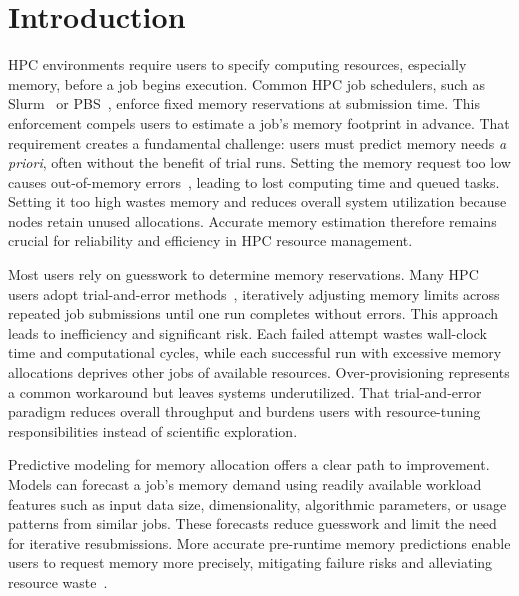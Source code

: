 \section{Introduction}
\label{sec:pmc-introduction}

\ac{HPC} environments require users to specify computing resources, especially memory, before a job begins execution.
Common \ac{HPC} job schedulers, such as Slurm~\cite{yoo2003slurm} or \ac{PBS}~\cite{henderson1995pbs}, enforce fixed memory reservations at submission time.
This enforcement compels users to estimate a job's memory footprint in advance.
That requirement creates a fundamental challenge: users must predict memory needs \emph{a priori}, often without the benefit of trial runs.
Setting the memory request too low causes out-of-memory errors~\cite{bailey2005,hovestadt2003}, leading to lost computing time and queued tasks.
Setting it too high wastes memory and reduces overall system utilization because nodes retain unused allocations.
Accurate memory estimation therefore remains crucial for reliability and efficiency in \ac{HPC} resource management.

Most users rely on guesswork to determine memory reservations.
Many \ac{HPC} users adopt trial-and-error methods~\cite{ncsu_memory_usage}, iteratively adjusting memory limits across repeated job submissions until one run completes without errors.
This approach leads to inefficiency and significant risk.
Each failed attempt wastes wall-clock time and computational cycles, while each successful run with excessive memory allocations deprives other jobs of available resources.
Over-provisioning represents a common workaround but leaves systems underutilized.
That trial-and-error paradigm reduces overall throughput and burdens users with resource-tuning responsibilities instead of scientific exploration.

Predictive modeling for memory allocation offers a clear path to improvement.
Models can forecast a job's memory demand using readily available workload features such as input data size, dimensionality, algorithmic parameters, or usage patterns from similar jobs.
These forecasts reduce guesswork and limit the need for iterative resubmissions.
More accurate pre-runtime memory predictions enable users to request memory more precisely, mitigating failure risks and alleviating resource waste~\cite{tanash2021ampro}.


